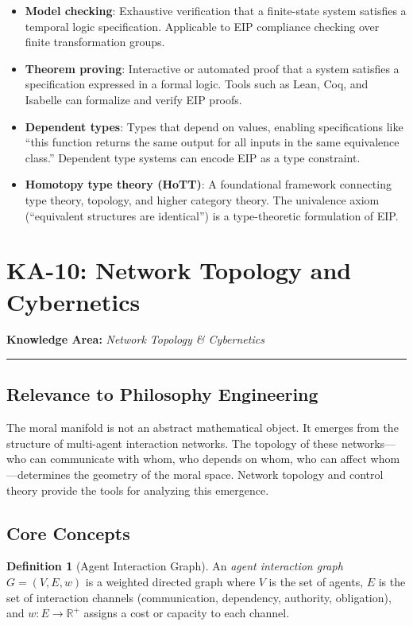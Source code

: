 \documentclass[12pt,letterpaper]{article}
\theoremstyle{definition}
\newtheorem{definition}[theorem]{Definition}
\theoremstyle{plain}
\newcommand{\R}{\mathbb{R}}
\newcommand{\ka}[1]{\vspace{1em}\noindent\textbf{\large Knowledge Area:} \textit{#1}\vspace{0.5em}\hrule\vspace{0.5em}}
\begin{document}
\begin{itemize}
    \item \textbf{Model checking}: Exhaustive verification that a finite-state system satisfies a temporal logic specification. Applicable to EIP compliance checking over finite transformation groups.
    \item \textbf{Theorem proving}: Interactive or automated proof that a system satisfies a specification expressed in a formal logic. Tools such as Lean, Coq, and Isabelle can formalize and verify EIP proofs.
    \item \textbf{Dependent types}: Types that depend on values, enabling specifications like ``this function returns the same output for all inputs in the same equivalence class.'' Dependent type systems can encode EIP as a type constraint.
    \item \textbf{Homotopy type theory (HoTT)}: A foundational framework connecting type theory, topology, and higher category theory. The univalence axiom (``equivalent structures are identical'') is a type-theoretic formulation of EIP.
\end{itemize}


\section{KA-10: Network Topology and Cybernetics}
\label{sec:ka10}

\ka{Network Topology \& Cybernetics}

\subsection{Relevance to Philosophy Engineering}

The moral manifold is not an abstract mathematical object. It emerges from the structure of multi-agent interaction networks. The topology of these networks---who can communicate with whom, who depends on whom, who can affect whom---determines the geometry of the moral space. Network topology and control theory provide the tools for analyzing this emergence.

\subsection{Core Concepts}

\begin{definition}[Agent Interaction Graph]
An \emph{agent interaction graph} $G = (V, E, w)$ is a weighted directed graph where $V$ is the set of agents, $E$ is the set of interaction channels (communication, dependency, authority, obligation), and $w: E \to \R^+$ assigns a cost or capacity to each channel.
\end{definition}
\end{document}
